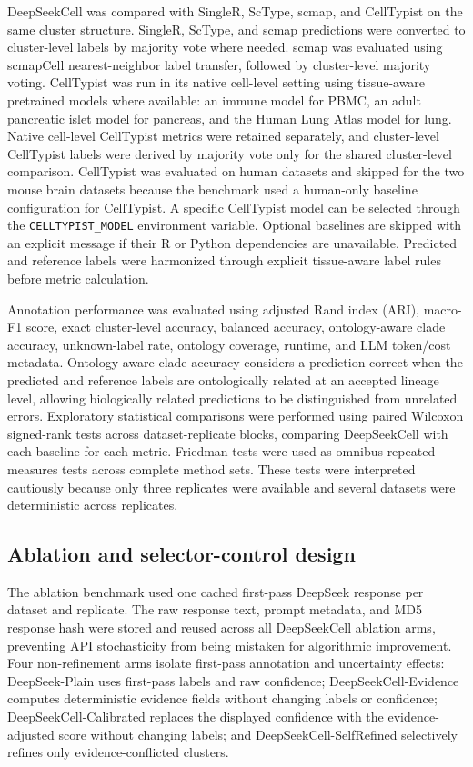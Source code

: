 \documentclass[referee,lineno,pdflatex]{sn-jnl}
\begin{document}
DeepSeekCell was compared with SingleR, ScType, scmap, and CellTypist on the same cluster structure. SingleR, ScType, and scmap predictions were converted to cluster-level labels by majority vote where needed. scmap was evaluated using scmapCell nearest-neighbor label transfer, followed by cluster-level majority voting. CellTypist was run in its native cell-level setting using tissue-aware pretrained models where available: an immune model for PBMC, an adult pancreatic islet model for pancreas, and the Human Lung Atlas model for lung. Native cell-level CellTypist metrics were retained separately, and cluster-level CellTypist labels were derived by majority vote only for the shared cluster-level comparison. CellTypist was evaluated on human datasets and skipped for the two mouse brain datasets because the benchmark used a human-only baseline configuration for CellTypist. A specific CellTypist model can be selected through the \texttt{CELLTYPIST\_MODEL} environment variable. Optional baselines are skipped with an explicit message if their R or Python dependencies are unavailable. Predicted and reference labels were harmonized through explicit tissue-aware label rules before metric calculation.

Annotation performance was evaluated using adjusted Rand index (ARI), macro-F1 score, exact cluster-level accuracy, balanced accuracy, ontology-aware clade accuracy, unknown-label rate, ontology coverage, runtime, and LLM token/cost metadata. Ontology-aware clade accuracy considers a prediction correct when the predicted and reference labels are ontologically related at an accepted lineage level, allowing biologically related predictions to be distinguished from unrelated errors. Exploratory statistical comparisons were performed using paired Wilcoxon signed-rank tests across dataset-replicate blocks, comparing DeepSeekCell with each baseline for each metric. Friedman tests were used as omnibus repeated-measures tests across complete method sets. These tests were interpreted cautiously because only three replicates were available and several datasets were deterministic across replicates.

\subsection{Ablation and selector-control design}

The ablation benchmark used one cached first-pass DeepSeek response per dataset and replicate. The raw response text, prompt metadata, and MD5 response hash were stored and reused across all DeepSeekCell ablation arms, preventing API stochasticity from being mistaken for algorithmic improvement. Four non-refinement arms isolate first-pass annotation and uncertainty effects: DeepSeek-Plain uses first-pass labels and raw confidence; DeepSeekCell-Evidence computes deterministic evidence fields without changing labels or confidence; DeepSeekCell-Calibrated replaces the displayed confidence with the evidence-adjusted score without changing labels; and DeepSeekCell-SelfRefined selectively refines only evidence-conflicted clusters.
\end{document}
